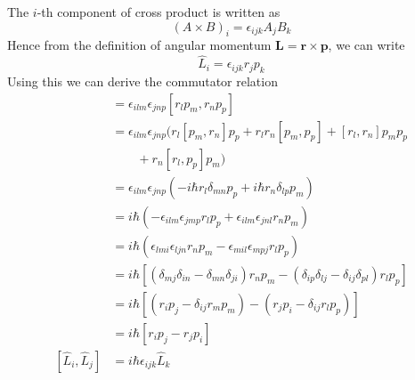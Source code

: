 \documentclass[../../../main.tex]{subfiles}
\begin{document}
The $i$-th component of cross product is written as
\begin{equation*}
    (A \times B)_i = \epsilon_{ijk} A_j B_k
\end{equation*}
Hence from the definition of angular momentum $\mathbf{L }= \mathbf{r }\times \mathbf{p}$, we can write
\begin{equation*}
    \hat{L}_i =\epsilon_{ijk}r_jp_k
\end{equation*}
Using this we can derive the commutator relation
\begin{align*}
    [\hat{L}_i, \hat{L}_j]
     & = \epsilon_{ilm} \epsilon_{jnp} [ r_lp_m,r_np_p]                                                                                                                             \\
     & =  \epsilon_{ilm} \epsilon_{jnp}(  r_l[p_m, r_n]p_p + r_l r_n[p_m, p_p] + [r_l, r_n] p_m p_p                                                                                 \\
     & \qquad  + r_n [r_l, p_p] p_m)                                                                                                                                                \\
     & =  \epsilon_{ilm} \epsilon_{jnp}\left( - i \hbar  r_l \delta_{mn} p_p + i \hbar  r_n \delta_{lp} p_m \right)                                                                 \\
     & = i \hbar \left( -\epsilon_{ilm }\epsilon_{jmp }r_lp_p + \epsilon_{ilm }\epsilon_{jnl }  r_np_m\right)                                                                       \\
     & = i \hbar \left( \epsilon_{lmi }\epsilon_{ljn}r_n  p_m - \epsilon_{mil }\epsilon_{mpj }r_l p_p\right)                                                                        \\
     & = i \hbar \left[ \left( \delta_{mj }\delta_{in }-\delta_{mn }\delta_{ji } \right)r_np_m - \left( \delta_{ip }\delta_{lj } - \delta_{ij }\delta_{pl }\right)r_lp_p    \right] \\
     & = i \hbar \left[ \left( r_i p_j -\delta_{ij }r_m p_m\right) -\left( r_jp_i-\delta_{ij }r_l p_p \right)   \right]                                                             \\
     & = i \hbar \left[ r_i p_j  -r_jp_i \right]                                                                                                                                    \\
    [\hat{L}_i, \hat{L}_j]
     & = i \hbar \epsilon_{ijk}\hat{L}_k
\end{align*}
\end{document}

